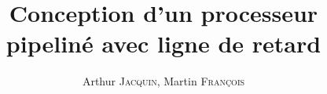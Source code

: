 \documentclass{hibiscus}
\title{Conception d'un processeur pipeliné avec ligne de retard}
\author{Arthur \textsc{Jacquin}, Martin \textsc{François}}
\begin{document}
\coverpage                      %
\foreword                       %
\tableofcontents









\figureslist                    %
\tableslist                     %
\scriptslist                    %
\bibliographyreferenceslist     %



\appendix
% 
\end{document}
